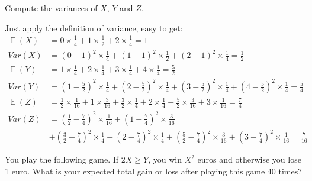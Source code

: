 \documentclass[a4paper,10pt]{article}
\begin{document}
\begin{subproblem}{3}
Compute the variances of $X$, $Y$ and $Z$.
\end{subproblem}

\begin{solution}
Just apply the definition of variance, easy to get:
    \begin{align}
        \mathop{{}\mathbb{E}}(X) &= 0 \times \frac{1}{4} + 1 \times \frac{1}{2} + 2 \times \frac{1}{4} = 1\\
        Var(X) &= (0-1)^{2} \times \frac{1}{4} + (1-1)^{2} \times \frac{1}{2} + (2-1)^{2} \times \frac{1}{4} = \frac{1}{2}\\
        \mathop{{}\mathbb{E}}(Y) &= 1 \times \frac{1}{4} + 2 \times \frac{1}{4} + 3 \times \frac{1}{4} + 4 \times \frac{1}{4} = \frac{5}{2} \\
        Var(Y) &= (1-\frac{5}{2})^{2} \times \frac{1}{4} + (2-\frac{5}{2})^{2} \times \frac{1}{4} + (3-\frac{5}{2})^{2} \times \frac{1}{4} + (4-\frac{5}{2})^{2} \times \frac{1}{4} = \frac{5}{4} \\
        \mathop{{}\mathbb{E}}(Z) &= \frac{1}{2} \times \frac{1}{16} + 1 \times \frac{3}{16} + \frac{3}{2} \times \frac{1}{4} + 2 \times \frac{1}{4} + \frac{5}{2} \times \frac{3}{16} + 3 \times \frac{1}{16} = \frac{7}{4} \\
        Var(Z) &= (\frac{1}{2}-\frac{7}{4})^{2} \times \frac{1}{16} + (1-\frac{7}{4})^{2} \times \frac{3}{16} \\
        &+ (\frac{3}{2}-\frac{7}{4})^{2} \times \frac{1}{4} + (2-\frac{7}{4})^{2} \times \frac{1}{4} + (\frac{5}{2}-\frac{7}{4})^{2} \times \frac{3}{16} + (3-\frac{7}{4})^{2} \times \frac{1}{16}= \frac{7}{16}
    \end{align}
\end{solution}

\begin{subproblem}{2}
You play the following game. If $2X \ge Y$, you win $X^2$ euros and otherwise you lose 1 euro. What is your expected total gain or loss after playing this game $40$ times?
\end{subproblem}
\end{document}
